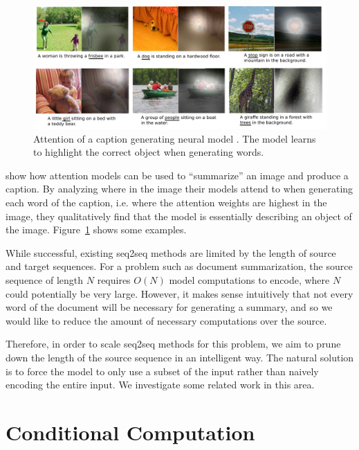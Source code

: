 \documentclass[12pt]{report}
\begin{document}
\begin{figure}[t]
\centering
\includegraphics[width=\textwidth]{images/xucaption}
\caption[Attention for Image Captioning]{Attention of a caption generating neural model \citep{xu2015captioning}. The model learns to highlight the correct object when generating words.}
\label{fig:caption}
\end{figure}

\citet{xu2015captioning} show how attention models can be used to ``summarize'' an image and produce a caption. 
By analyzing where in the image their models attend to when generating each word of the caption, i.e. where the attention weights are highest in the image, they qualitatively find that the model is essentially describing an object of the image. 
Figure~\ref{fig:caption} shows some examples.



While successful, existing seq2seq methods are limited by the length of source and target sequences. For a problem such as document summarization, the source sequence of length $N$ requires $O(N)$ model computations to encode, where $N$ could potentially be very large. However, it makes sense intuitively that not every word of the document will be necessary for generating a summary, and so we would like to reduce the amount of necessary computations over the source.

Therefore, in order to scale seq2seq methods for this problem, we aim to prune down the length of the source sequence in an intelligent way. The natural solution is to force the model to only use a subset of the input rather than naively encoding the entire input. We investigate some related work in this area.


\section{Conditional Computation}


\end{document}
